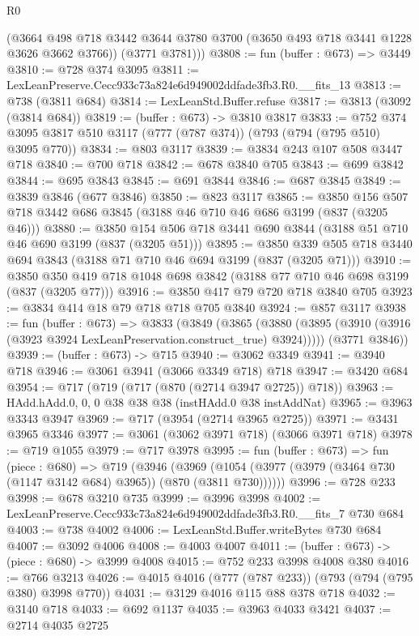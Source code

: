 \begin{lexlean}{R0}
\begin{coremodule}
        (@3664 @498 @718 @3442 @3644 @3780 @3700 (@3650 @493 @718 @3441 @1228 @3626 @3662 @3766))
        (@3771 @3781)))
@3808 := fun (buffer : @673) => @3449
@3810 := @728 @374 @3095
@3811 := LexLeanPreserve.Cecc933c73a824e6d949002ddfade3fb3.R0.__fits_13
@3813 := @738 (@3811 @684)
@3814 := LexLeanStd.Buffer.refuse
@3817 := @3813 (@3092 (@3814 @684))
@3819 := (buffer : @673) -> @3810 @3817
@3833 := @752 @374 @3095 @3817 @510 @3117 (@777 (@787 @374)) (@793 (@794 (@795 @510) @3095 @770))
@3834 := @803 @3117
@3839 := @3834 @243 @107 @508 @3447 @718
@3840 := @700 @718
@3842 := @678 @3840 @705
@3843 := @699 @3842
@3844 := @695 @3843
@3845 := @691 @3844
@3846 := @687 @3845
@3849 := @3839 @3846 (@677 @3846)
@3850 := @823 @3117
@3865 := @3850 @156 @507 @718 @3442 @686 @3845 (@3188 @46 @710 @46 @686 @3199 (@837 (@3205 @46)))
@3880 := @3850 @154 @506 @718 @3441 @690 @3844 (@3188 @51 @710 @46 @690 @3199 (@837 (@3205 @51)))
@3895 := @3850 @339 @505 @718 @3440 @694 @3843 (@3188 @71 @710 @46 @694 @3199 (@837 (@3205 @71)))
@3910 := @3850 @350 @419 @718 @1048 @698 @3842 (@3188 @77 @710 @46 @698 @3199 (@837 (@3205 @77)))
@3916 := @3850 @417 @79 @720 @718 @3840 @705
@3923 := @3834 @414 @18 @79 @718 @718 @705 @3840
@3924 := @857 @3117
@3938 := fun (buffer : @673) =>
  @3833
    (@3849
      (@3865 (@3880 (@3895 (@3910 (@3916 (@3923 @3924 LexLeanPreservation.construct_true) @3924)))))
      (@3771 @3846))
@3939 := (buffer : @673) -> @715
@3940 := @3062 @3349
@3941 := @3940 @718
@3946 := @3061 @3941 (@3066 @3349 @718) @718
@3947 := @3420 @684
@3954 := @717 (@719 (@717 (@870 (@2714 @3947 @2725)) @718))
@3963 := HAdd.hAdd.{0, 0, 0} @38 @38 @38 (instHAdd.{0} @38 instAddNat)
@3965 := @3963 @3343 @3947
@3969 := @717 (@3954 (@2714 @3965 @2725))
@3971 := @3431 @3965 @3346
@3977 := @3061 (@3062 @3971 @718) (@3066 @3971 @718)
@3978 := @719 @1055
@3979 := @717 @3978
@3995 := fun (buffer : @673) =>
  fun (piece : @680) =>
  @719
    (@3946
      (@3969 (@1054 (@3977 (@3979 (@3464 @730 (@1147 @3142 @684) @3965)) (@870 (@3811 @730))))))
@3996 := @728 @233
@3998 := @678 @3210 @735
@3999 := @3996 @3998
@4002 := LexLeanPreserve.Cecc933c73a824e6d949002ddfade3fb3.R0.__fits_7 @730 @684
@4003 := @738 @4002
@4006 := LexLeanStd.Buffer.writeBytes @730 @684
@4007 := @3092 @4006
@4008 := @4003 @4007
@4011 := (buffer : @673) -> (piece : @680) -> @3999 @4008
@4015 := @752 @233 @3998 @4008 @380
@4016 := @766 @3213
@4026 := @4015 @4016 (@777 (@787 @233)) (@793 (@794 (@795 @380) @3998 @770))
@4031 := @3129 @4016 @115 @88 @378 @718
@4032 := @3140 @718
@4033 := @692 @1137
@4035 := @3963 @4033 @3421
@4037 := @2714 @4035 @2725

\end{coremodule}
\end{lexlean}
